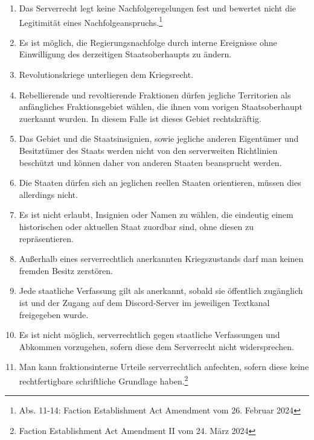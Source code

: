 \documentclass{article}
\begin{document}
\begin{enumerate}[(1)]
	\item Das Serverrecht legt keine Nachfolgeregelungen fest und bewertet nicht die Legitimität eines Nachfolgeanspruchs.\footnote{Abs. 11-14: Faction Establishment Act Amendment vom 26. Februar 2024}
	\item Es ist möglich, die Regierungsnachfolge durch interne Ereignisse ohne Einwilligung des derzeitigen Staatsoberhaupts zu ändern.
	\item Revolutionskriege unterliegen dem Kriegsrecht.
	\item Rebellierende und revoltierende Fraktionen dürfen jegliche Territorien als anfängliches Fraktionsgebiet wählen, die ihnen vom vorigen Staatsoberhaupt zuerkannt wurden. In diesem Falle ist dieses Gebiet rechtskräftig.
    \item Das Gebiet und die Staatsinsignien, sowie jegliche anderen Eigentümer und Besitztümer des Staats werden nicht von den serverweiten Richtlinien beschützt und können daher von anderen Staaten beansprucht werden.
    \item Die Staaten dürfen sich an jeglichen reellen Staaten orientieren, müssen dies allerdings nicht.
    \item Es ist nicht erlaubt, Insignien oder Namen zu wählen, die eindeutig einem historischen oder aktuellen Staat zuordbar sind, ohne diesen zu repräsentieren.	
    \item Außerhalb eines serverrechtlich anerkannten Kriegszustands darf man keinen fremden Besitz zerstören.
    \item Jede staatliche Verfassung gilt als anerkannt, sobald sie öffentlich zugänglich ist und der Zugang auf dem Discord-Server im jeweiligen Textkanal freigegeben wurde.
    \item Es ist nicht möglich, serverrechtlich gegen staatliche Verfassungen und Abkommen vorzugehen, sofern diese dem Serverrecht nicht widersprechen.
    \item Man kann fraktionsinterne Urteile serverrechtlich anfechten, sofern diese keine rechtfertigbare schriftliche Grundlage haben.\footnote{Faction Establishment Act Amendment II vom 24. März 2024}
\end{enumerate}
\end{document}

